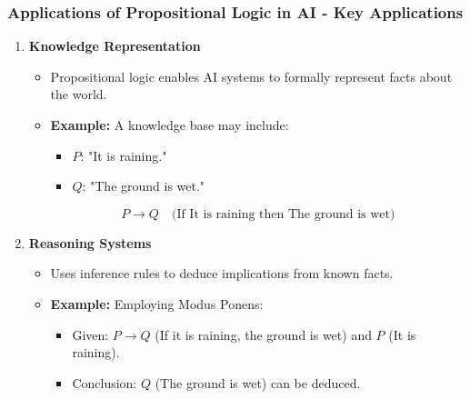 \documentclass[aspectratio=169]{beamer}
\begin{document}
\begin{frame}[fragile]
    \frametitle{Applications of Propositional Logic in AI - Key Applications}
    \begin{enumerate}
        \item \textbf{Knowledge Representation}
            \begin{itemize}
                \item Propositional logic enables AI systems to formally represent facts about the world.
                \item \textbf{Example:} A knowledge base may include:
                    \begin{itemize}
                        \item $P$: "It is raining."
                        \item $Q$: "The ground is wet."
                    \end{itemize}
                    \begin{equation}
                        P \rightarrow Q \quad \text{(If It is raining then The ground is wet)}
                    \end{equation}
            \end{itemize}
        
        \item \textbf{Reasoning Systems}
            \begin{itemize}
                \item Uses inference rules to deduce implications from known facts.
                \item \textbf{Example:} Employing Modus Ponens:
                    \begin{itemize}
                        \item Given: $P \rightarrow Q$ (If it is raining, the ground is wet) and $P$ (It is raining).
                        \item Conclusion: $Q$ (The ground is wet) can be deduced.
                    \end{itemize}
            \end{itemize}
    \end{enumerate}
\end{frame}
\end{document}
